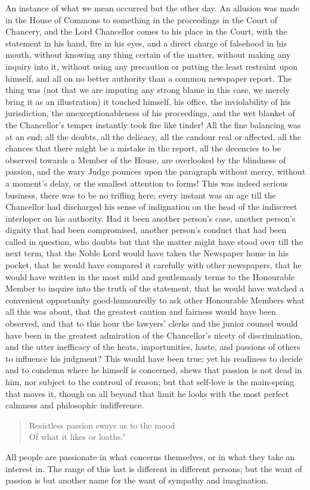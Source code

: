An instance of what we mean occurred but the other day. An
allusion was made in the House of Commons to something in the
proceedings in the Court of Chancery, and the Lord Chancellor
comes to his place in the Court, with the statement in his hand,
fire in his eyes, and a direct charge of falsehood in his mouth,
without knowing any thing certain of the matter, without making
any inquiry into it, without using any precaution or putting the
least restraint upon himself, and all on no better authority than
a common newspaper report. The thing was (not that we are imputing
any strong blame in this case, we merely bring it as an
illustration) it touched himself, his office, the inviolability of
his jurisdiction, the unexceptionableness of his proceedings, and
the wet blanket of the Chancellor's temper instantly took fire
like tinder! All the fine balancing was at an end; all the doubts,
all the delicacy, all the candour real or affected, all the
chances that there might be a mistake in the report, all the
decencies to be observed towards a Member of the House, are
overlooked by the blindness of passion, and the wary Judge pounces
upon the paragraph without mercy, without a moment's delay, or the
smallest attention to forms! This was indeed serious business,
there was to be no trifling here; every instant was an age till
the Chancellor had discharged his sense of indignation on the head
of the indiscreet interloper on his authority. Had it been another
person's case, another person's dignity that had been compromised,
another person's conduct that had been called in question, who
doubts but that the matter might have stood over till the next
term, that the Noble Lord would have taken the Newspaper home in
his pocket, that he would have compared it carefully with other
newspapers, that he would have written in the most mild and
gentlemanly terms to the Honourable Member to inquire into the
truth of the statement, that he would have watched a convenient
opportunity good-humouredly to ask other Honourable Members what
all this was about, that the greatest caution and fairness would
have been observed, and that to this hour the lawyers' clerks and
the junior counsel would have been in the greatest admiration of
the Chancellor's nicety of discrimination, and the utter
inefficacy of the heats, importunities, haste, and passions of
others to influence his judgment? This would have been true; yet
his readiness to decide and to condemn where he himself is
concerned, shews that passion is not dead in him, nor subject to
the controul of reason; but that self-love is the main-spring that
moves it, though on all beyond that limit he looks with the most
perfect calmness and philosophic indifference.
\begin{verse}
  Resistless passion sways us to the mood \\
  Of what it likes or loaths.''

\end{verse}
All people are passionate in what concerns themselves, or in what
they take an interest in. The range of this last is different in
different persons; but the want of passion is but another name for
the want of sympathy and imagination.

